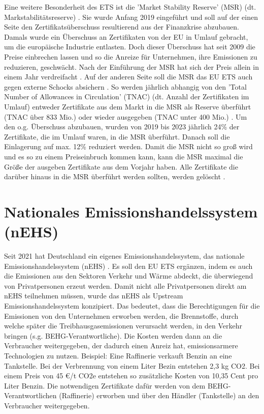 Eine weitere Besonderheit des ETS ist die 'Market Stability Reserve' (MSR) (dt. Markstabilitätsreserve) \cite{eu3.2023}. Sie wurde Anfang 2019 eingeführt und soll auf der einen Seite den Zertifikatsüberschuss resultierend aus der Finanzkrise abzubauen. 
Damals wurde ein Überschuss an Zertifikaten von der EU in Umlauf gebracht, um die europäische Industrie entlasten. 
Doch dieser Überschuss hat seit 2009 die Preise einbrechen lassen und so die Anreize für Unternehmen, ihre Emissionen zu reduzieren, geschwächt. Nach der Einführung der MSR hat sich der Preis allein in einem Jahr verdreifacht .
Auf der anderen Seite soll die MSR das EU ETS auch gegen externe Schocks absichern \cite{eu3.2023}. 
So werden jährlich abhangig von den 'Total Number of Allowances in Circulation' (TNAC) (dt. Anzahl der Zertifikaten im Umlauf) entweder Zertifikate aus dem Markt in die MSR als Reserve überführt (TNAC über 833 Mio.) oder wieder ausgegeben (TNAC unter 400 Mio.) \cite[S. 7]{icap2.2023}. 
Um den o.g. Überschuss abzubauen, wurden von 2019 bis 2023 jährlich 24\% der Zertifikate, die im Umlauf waren, in die MSR überführt. 
Danach soll die Einlagerung auf max. 12\% reduziert werden.
Damit die MSR nicht so groß wird und es so zu einem Preiseinbruch kommen kann, kann die MSR maximal die Größe der ausgeben Zertifikate aus dem Vorjahr haben. 
Alle Zertifikate die darüber hinaus in die MSR überführt werden sollten, werden gelöscht \cite{eu3.2023}. 

\section{Nationales Emissionshandelssystem (nEHS)}

Seit 2021 hat Deutschland ein eigenes Emissionshandelssystem, das nationale Emissionshandelssystem (nEHS) \cite{dehst.2023}. Es soll den EU ETS ergänzen, indem es auch die Emissionen aus den Sektoren Verkehr und Wärme abdeckt, die überwiegend von Privatpersonen erzeut werden. 
Damit nicht alle Privatpersonen direkt am nEHS teilnehmen müssen, wurde das nEHS als Upstream Emissionshandelssystem konzipiert. 
Das bedeutet, dass die Berechtigungen für die Emissionen von den Unternehmen erworben werden, die Brennstoffe, durch welche später die Treibhausgasemissionen verursacht werden, in den Verkehr bringen (s.g. BEHG-Verantwortliche). 
Die Kosten werden dann an die Verbraucher weitergegeben, der dadurch einen Anreiz hat, emissionsarmere Technologien zu nutzen. Beispiel: Eine Raffinerie verkauft Benzin an eine Tankstelle. 
Bei der Verbrennung von einem Liter Bezin entstehen 2,3 kg CO2. Bei einem Preis von 45 €/t CO2e entstehen so zusätzliche Kosten von 10,35 Cent pro Liter Benzin. 
Die notwendigen Zertifikate dafür werden von dem BEHG-Verantwortlichen (Raffinerie) erworben und über den Händler (Tankstelle) an den Verbraucher weitergegeben.

